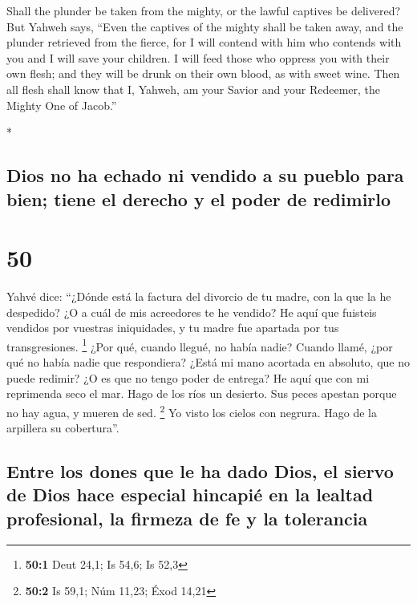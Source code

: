 \begin{paracol}{2}
\begin{otherlanguage}{english}
 Shall the plunder be taken from the mighty, or the
lawful captives be delivered?  But Yahweh says, ``Even
the captives of the mighty shall be taken away, and the plunder
retrieved from the fierce, for I will contend with him who contends with
you and I will save your children.  I will feed those who
oppress you with their own flesh; and they will be drunk on their own
blood, as with sweet wine. Then all flesh shall know that I, Yahweh, am
your Savior and your Redeemer, the Mighty One of Jacob.''

\end{otherlanguage}

\switchcolumn[0]*

\hypertarget{dios-no-ha-echado-ni-vendido-a-su-pueblo-para-bien-tiene-el-derecho-y-el-poder-de-redimirlo}{%
\subsection{Dios no ha echado ni vendido a su pueblo para bien; tiene el
derecho y el poder de
redimirlo}\label{dios-no-ha-echado-ni-vendido-a-su-pueblo-para-bien-tiene-el-derecho-y-el-poder-de-redimirlo}}

\hypertarget{section-98}{%
\section{50}\label{section-98}}

 Yahvé dice: ``¿Dónde está la factura del divorcio de tu
madre, con la que la he despedido? ¿O a cuál de mis acreedores te he
vendido? He aquí que fuisteis vendidos por vuestras iniquidades, y tu
madre fue apartada por tus transgresiones. \footnote{\textbf{50:1} Deut
  24,1; Is 54,6; Is 52,3}  ¿Por qué, cuando llegué, no
había nadie? Cuando llamé, ¿por qué no había nadie que respondiera?
¿Está mi mano acortada en absoluto, que no puede redimir? ¿O es que no
tengo poder de entrega? He aquí que con mi reprimenda seco el mar. Hago
de los ríos un desierto. Sus peces apestan porque no hay agua, y mueren
de sed. \footnote{\textbf{50:2} Is 59,1; Núm 11,23; Éxod 14,21}
 Yo visto los cielos con negrura. Hago de la arpillera su
cobertura''.

\hypertarget{entre-los-dones-que-le-ha-dado-dios-el-siervo-de-dios-hace-especial-hincapiuxe9-en-la-lealtad-profesional-la-firmeza-de-fe-y-la-tolerancia}{%
\subsection{Entre los dones que le ha dado Dios, el siervo de Dios hace
especial hincapié en la lealtad profesional, la firmeza de fe y la
tolerancia}\label{entre-los-dones-que-le-ha-dado-dios-el-siervo-de-dios-hace-especial-hincapiuxe9-en-la-lealtad-profesional-la-firmeza-de-fe-y-la-tolerancia}}


\end{paracol}
